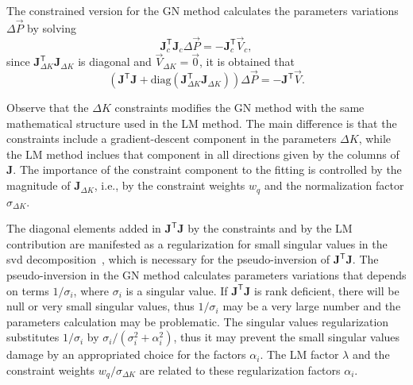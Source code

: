 The constrained version for the GN method calculates the parameters variations $\Delta \vec{P}$ by solving
\begin{equation}
\mathbf{J}^{\mathsf{T}}_c\mathbf{J}_c\Delta \vec{P} = - \mathbf{J}^{\mathsf{T}}_c\vec{V}_c,
\end{equation}
since $\mathbf{J}^{\mathsf{T}}_{\Delta K}\mathbf{J}_{\Delta K}$ is diagonal and $\vec{V}_{\Delta K} = \vec{0}$, it is obtained that
\begin{equation}
    \left(\mathbf{J}^{\mathsf{T}}\mathbf{J}  + \mathrm{diag}\left(\mathbf{J}^{\mathsf{T}}_{\Delta K}\mathbf{J}_{\Delta K}\right) \right)\Delta \vec{P} =  - \mathbf{J}^{\mathsf{T}}\vec{V}.
    \label{eq:gn_modified}
\end{equation}

Observe that the $\Delta K$ constraints modifies the GN method with the same mathematical structure used in the LM method. The main difference is that the constraints include a gradient-descent component in the parameters $\Delta K$, while the LM method inclues that component in all directions given by the columns of $\mathbf{J}$. The importance of the constraint component to the fitting is controlled by the magnitude of $\mathbf{J}_{\Delta K}$, i.e., by the constraint weights $w_q$ and the normalization factor $\sigma_{\Delta K}$. 

The diagonal elements added in $\mathbf{J}^{\mathsf{T}}\mathbf{J}$ by the constraints and by the LM contribution are manifested as a regularization for small singular values in the \gls{svd} decomposition~\cite{huang2019beam}, which is necessary for the pseudo-inversion of $\mathbf{J}^{\mathsf{T}}\mathbf{J}$. The pseudo-inversion in the GN method calculates parameters variations that depends on terms $1/\sigma_i$, where $\sigma_i$ is a singular value. If $\mathbf{J}^{\mathsf{T}}\mathbf{J}$ is rank deficient, there will be null or very small singular values, thus $1/\sigma_i$ may be a very large number and the parameters calculation may be problematic. The singular values regularization substitutes $1/\sigma_i$ by $\sigma_i/\left(\sigma_i^2 + \alpha_i^2\right)$, thus it may prevent the small singular values damage by an appropriated choice for the factors $\alpha_i$. The LM factor $\lambda$ and the constraint weights $w_q/\sigma_{\Delta K}$ are related to these regularization factors $\alpha_i$.

